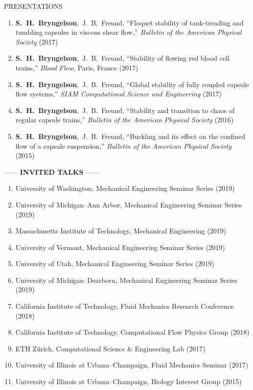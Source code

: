 \documentclass{resume} %
\makeatletter
\newlength{\bibhang}
\newlength{\bibsep}
\newenvironment{bibsection}%
        {\begin{enumerate}{}{%
       \setlength{\leftmargin}{\bibhang}%
       \setlength{\itemindent}{-\leftmargin}%
       \setlength{\itemsep}{\bibsep}%
       \setlength{\parsep}{\z@}%
        \setlength{\topsep}{0pt}}}
        {\end{enumerate}\vspace{-.1\baselineskip}}
\newcommand\Authors{\mbox{\textbf{S. H. Bryngelson}, J. B. Freund}}
\newcommand{\APS}{Bulletin of the American Physical Society}
\makeatother
\begin{document}
\begin{rSection}{{\Large P}RESENTATIONS}
\begin{bibsection}
	\item \Authors, 
    ``Floquet stability of tank-treading and tumbling capsules in viscous shear flow,'' 
	\textit{\APS} (2017)

	\item \Authors, 
    ``Stability of flowing red blood cell trains,'' 
	\textit{Blood Flow,} Paris, France (2017)			

	\item \Authors, 
    ``Global stability of fully coupled capsule flow systems,'' 
	\textit{SIAM Computational Science and Engineering} (2017)	

	\item \Authors, 
    ``Stability and transition to chaos of regular capsule trains,'' 
	\textit{\APS} (2016)		

	\item \Authors, 
    ``Buckling and its effect on the confined flow of a capsule suspension,'' 
    \textit{\APS} (2015)

\end{bibsection}
\medskip 

\begin{center}
    ------ \textbf{INVITED TALKS} ------
\end{center}

\begin{bibsection}
    \setlength{\itemsep}{\bibsep}%
    \item University of Washington, Mechanical Engineering Seminar Series (2019)
    \item University of Michigan--Ann Arbor, Mechanical Engineering Seminar Series (2019)
    \item Massachusetts Institute of Technology, Mechanical Engineering (2019)
    \item University of Vermont, Mechanical Engineering Seminar Series (2019)
    \item University of Utah, Mechanical Engineering Seminar Series (2019)
    \item University of Michigan--Dearborn, Mechanical Engineering Seminar Series (2019)
    \item California Institute of Technology, Fluid Mechanics Research Conference (2018)
    \item California Institute of Technology, Computational Flow Physics Group (2018)	
    \item ETH Z\"{u}rich, Computational Science \& Engineering Lab (2017)
    \item University of Illinois at Urbana--Champaign, Fluid Mechanics Seminar (2017)
    \item University of Illinois at Urbana--Champaign, Biology Interest Group (2015)
\end{bibsection}

\end{rSection}
\end{document}
